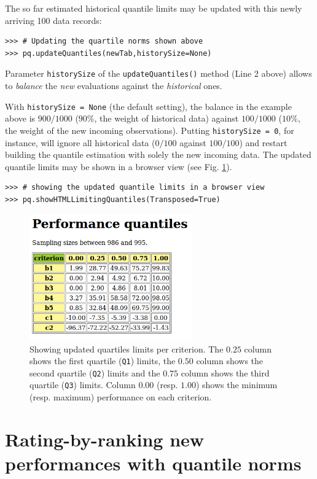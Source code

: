 The so far estimated historical quantile limits may be updated with this newly arriving 100 data records:
\begin{lstlisting}
>>> # Updating the quartile norms shown above 
>>> pq.updateQuantiles(newTab,historySize=None)
\end{lstlisting}
Parameter \texttt{historySize} of the \texttt{updateQuantiles()} method (Line 2 above) allows to \emph{balance} the \emph{new} evaluations against the \emph{historical} ones.

With \texttt{historySize = None} (the default setting), the balance in the example above is $900/1000$ ($90\%$, the weight of historical data) against $100/1000$ ($10\%$, the weight of the new incoming observations). Putting \texttt{historySize = 0}, for instance, will ignore all historical data ($0/100$ against $100/100$) and restart building the quantile estimation with solely the new incoming data. The updated quantile limits may be shown in a browser view (see Fig. \ref{fig:10.1}).
\begin{lstlisting}
>>> # showing the updated quantile limits in a browser view
>>> pq.showHTMLLimitingQuantiles(Transposed=True)
\end{lstlisting}
\begin{figure}[h]
\sidecaption[t]
\includegraphics[width=7cm]{Figures/examplePerfQuantiles.png}
\caption{Showing updated quartiles limits per criterion. The $0.25$ column shows the first quartile (\texttt{Q1}) limits, the $0.50$ column shows the second quartile (\texttt{Q2}) limits and the $0.75$ column shows the third quartile (\texttt{Q3}) limits. Column $0.00$ (resp. $1.00$) shows the minimum (resp. maximum) performance on each criterion.}
\label{fig:10.1}       %
\end{figure}
    
\section{Rating-by-ranking new performances with quantile norms}
\label{sec:10.3}

